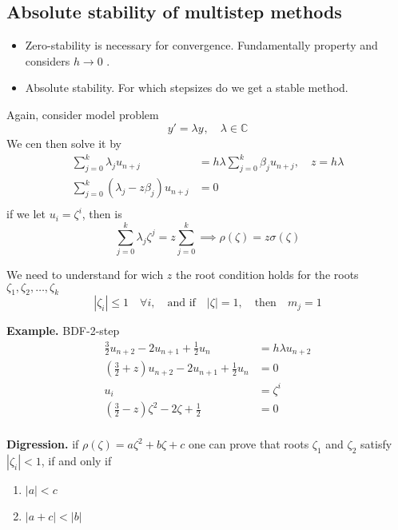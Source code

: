 \documentclass{article}
\theoremstyle{remark}
\begin{document}
\subsection{Absolute stability of multistep methods}%
\label{sub:absolute_stability_of_multistep_methods_}

\begin{itemize}
  \item
Zero-stability is necessary for convergence. Fundamentally property and considers $h\to 0$ . 
\item Absolute stability. For which stepsizes do we get a stable method.

\end{itemize}


Again, consider model problem \[
    y' = \lambda y_{} , \quad  \lambda  \in  \mathbb{C}  
\] 
We cen then solve it by
\[
  \begin{split}
\sum_{j=0}^{k}  \lambda _{j} u_{n+j}  & = h \lambda  \sum_{j=0}^{k}  \beta _{j} u_{n+j} , \quad  z = h\lambda   \\
\sum_{j= 0}^{k}  \left( \lambda _{j} - z \beta _{j} \right) u_{n+j} &=  0 \\
  \end{split} 
\] 
if we let $u_{i} =   \zeta ^{ i}$, then is \[
\sum_{j=0}^{k}  \lambda _{j} \zeta ^{j} = z \sum_{j=0}^{k}  \implies  \rho \left( \zeta  \right) = z \sigma \left( \zeta  \right)
\] 

We need to understand for wich $z$ the root condition holds for the roots $\zeta _{1}, \zeta  _{2}, \ldots , \zeta _{k} $ \[
 \left\lvert \zeta _{i} \right\rvert  \le 1 \quad  \forall i, \quad  \text{and if} \quad      \left\lvert \zeta  \right\rvert = 1, \quad \text{then} \quad m_{j} = 1     
\] 

\begin{tcolorbox}
  \textbf{Example.} BDF-2-step \[
    \begin{split}
  \frac{3}{2} u_{n+2} - 2u_{n+1} + \frac{1}{2} u_{n} &= h \lambda  u_{n+2} \\ 
  \left( \frac{3}{2} + z \right) u_{n+2} - 2 u_{n+1} + \frac{1}{2} u_{n} &= 0 \\
  u_{i}  & = \zeta ^{i} \\
  \left( \frac{3}{2} -z \right) \zeta ^{2} - 2 \zeta  + \frac{1}{2} &=  0 \\
    \end{split} 
  \] 
\end{tcolorbox}


\begin{tcolorbox}
  \textbf{Digression.}  if $\rho \left( \zeta  \right) = a \zeta ^2 + b \zeta  + c$ one can prove that roots $\zeta _{1}$ and $\zeta _{2}$ satisfy $\left\lvert \zeta _{i} \right\rvert  < 1$, if and only if 
  \begin{enumerate}[label=(\roman*)]
    \item $\left\lvert a \right\rvert  < c$
    \item $\left\lvert a+ c \right\rvert  < \left\lvert b \right\rvert $
  \end{enumerate}
\end{tcolorbox}
\end{document}
